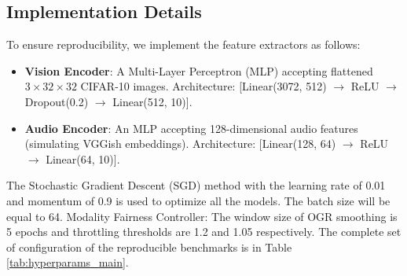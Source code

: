 \documentclass[10pt, twocolumn, letterpaper]{article}
\begin{document}
\begin{table}[h]
\centering
{}
\caption{\textbf{Benchmark Dataset Specifications.} We align our feature simulation with the statistical moments of these standard datasets to ensure realistic imbalance dynamics.}
\label{tab:datasets}
\end{table}

\subsection{Implementation Details}
To ensure reproducibility, we implement the feature extractors as follows:
\begin{itemize}
    \item \textbf{Vision Encoder}: A Multi-Layer Perceptron (MLP) accepting flattened $3 \times 32 \times 32$ CIFAR-10 images. Architecture: [Linear(3072, 512) $\rightarrow$ ReLU $\rightarrow$ Dropout(0.2) $\rightarrow$ Linear(512, 10)].
    \item \textbf{Audio Encoder}: An MLP accepting 128-dimensional audio features (simulating VGGish embeddings). Architecture: [Linear(128, 64) $\rightarrow$ ReLU $\rightarrow$ Linear(64, 10)].
\end{itemize}
The Stochastic Gradient Descent (SGD) method with the learning rate of 0.01 and momentum of 0.9 is used to optimize all the models. The batch size will be equal to 64. Modality Fairness Controller: The window size of OGR smoothing is 5 epochs and throttling thresholds are 1.2 and 1.05 respectively. The complete set of configuration of the reproducible benchmarks is in Table \ref{tab:hyperparams_main}.
\end{document}
